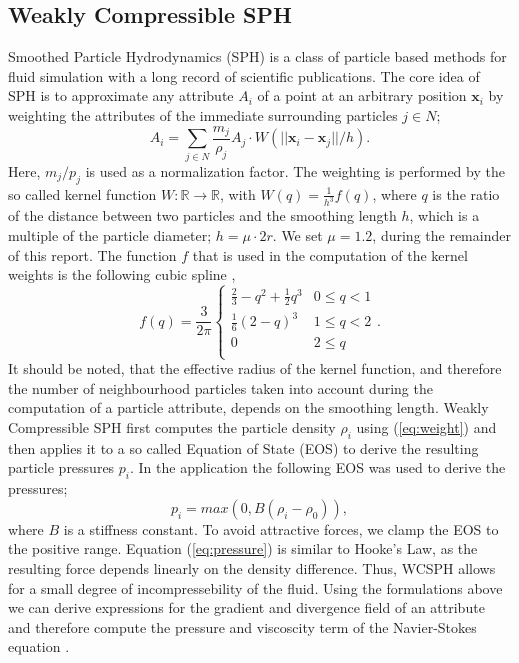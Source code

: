 \documentclass[11pt, letterpaper, twocolumn]{article}
\begin{document}
\subsection{Weakly Compressible SPH}
\label{subsec:wcsph}
Smoothed Particle Hydrodynamics (SPH) is a class of particle based methods for fluid simulation with a long record of scientific publications.
The core idea of SPH is to approximate any attribute \( A_i\) of a point at an arbitrary position \(\mathbf{x}_i\) by weighting the attributes of the immediate surrounding particles \(j \in N \);
\begin{equation}
  A_i = \sum_{j \in N} \frac{m_j}{\rho_j}  A_j \cdot  W(||\mathbf{x}_i - \mathbf{x}_j||/h).
  \label{eq:weight}
\end{equation}
Here, $m_j / p_j$ is used as a normalization factor.
The weighting is performed by the so called kernel function \( W : \mathbb{R} \rightarrow \mathbb{R}\), with \(W(q) = \frac{1}{h^3}f(q)\), 
where $q$ is the ratio of the distance between two particles and the smoothing length \(h\), which is a multiple of the particle diameter; \(h = \mu \cdot 2r\).
We set \(\mu = 1.2\), during the remainder of this report.
The function $f$ that is used in the computation of the kernel weights is the following cubic spline \cite{monaghan1992},
\begin{equation}
  f(q) = \frac{3}{2\pi}
  \begin{cases}
    \frac{2}{3} - q^2 + \frac{1}{2}q^3 & 0 \leq q < 1 \\
    \frac{1}{6}(2-q)^3 & 1 \leq q < 2 \\
    0 & 2 \leq q \\
  \end{cases}
  .
\end{equation}
It should be noted, that the effective radius of the kernel function, and therefore the number of neighbourhood particles taken into account during the computation of a particle attribute, depends on the smoothing length.
Weakly Compressible SPH first computes the particle density \(\rho_i\) using (\ref{eq:weight}) and then applies it to a so called Equation of State (EOS) to derive the resulting particle pressures \(p_i\). In the application the following EOS was used to derive the pressures;
\begin{equation}
  p_i = max(0, B(\rho_i - \rho_0)),
  \label{eq:pressure}
\end{equation}
where \(B\) is a stiffness constant. To avoid attractive forces, we clamp the EOS to the positive range. Equation (\ref{eq:pressure}) is similar to Hooke's Law, as the resulting force depends linearly on the density difference. Thus, WCSPH allows for a small degree of incompressebility of the fluid.
Using the formulations above we can derive expressions for the gradient and divergence field of an attribute and therefore compute the pressure and viscoscity term of the Navier-Stokes equation \cite{ihmsen2014}.
\end{document}
